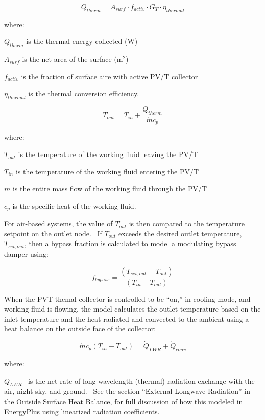 \begin{equation}
{Q_{therm}} = {A_{surf}} \cdot {f_{activ}} \cdot {G_T} \cdot {\eta_{thermal}}
\end{equation}

where:

\({Q_{therm}}\) is the thermal energy collected (W)

\({A_{surf}}\) is the net area of the surface (m\(^{2}\))

\({f_{activ}}\) is the fraction of surface aire with active PV/T collector

\({\eta_{thermal}}\) is the thermal conversion efficiency.

\begin{equation}
{T_{out}} = {T_{in}} + \frac{{{Q_{therm}}}}{{\dot m{c_p}}}
\end{equation}

where:

\({T_{out}}\) is the temperature of the working fluid leaving the PV/T

\({T_{in}}\) is the temperature of the working fluid entering the PV/T

\(\dot m\) is the entire mass flow of the working fluid through the PV/T

\({c_p}\) is the specific heat of the working fluid.

For air-based systems, the value of \({T_{out}}\) is then compared to the temperature setpoint on the outlet node.~ If \({T_{out}}\) exceeds the desired outlet temperature, \({T_{set,out}}\), then a bypass fraction is calculated to model a modulating bypass damper using:

\begin{equation}
{f_{bypass}} = \frac{{\left( {{T_{set,out}} - {T_{out}}} \right)}}{{\left( {{T_{in}} - {T_{out}}} \right)}}
\end{equation}

When the PVT themal collector is controlled to be ``on,'' in cooling mode, and working fluid is flowing, the model calculates the outlet temperature based on the inlet temperature and the heat radiated and convected to the ambient using a heat balance on the outside face of the collector:

\begin{equation}
\dot m{c_p}\left( {{T_{in}} - {T_{out}}} \right) = {\dot Q_{LWR}} + {\dot Q_{conv}}
\end{equation}

where:

\({\dot Q_{LWR}}\) ~is the net rate of long wavelength (thermal) radiation exchange with the air, night sky, and ground.~ See the section ``External Longwave Radiation'' in the Outside Surface Heat Balance, for full discussion of how this modeled in EnergyPlus using linearized radiation coefficients.

